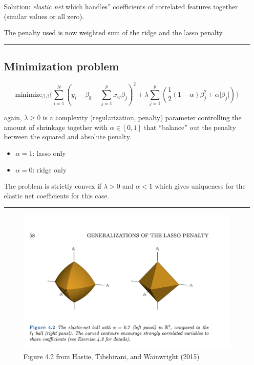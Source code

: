 \documentclass[
  letterpaper,
  DIV=11,
  numbers=noendperiod]{scrartcl}
\providecommand{\tightlist}{%
  \setlength{\itemsep}{0pt}\setlength{\parskip}{0pt}}\usepackage{longtable,booktabs,array}
\begin{document}
Solution: \emph{elastic net} which handles'' coefficients of correlated
features together (similar values or all zero).

The penalty used is now weighted sum of the ridge and the lasso penalty.

\begin{center}\rule{0.5\linewidth}{0.5pt}\end{center}

\hypertarget{minimization-problem}{%
\subsection{Minimization problem}\label{minimization-problem}}

\[ \text{minimize}_{\beta_,\beta} \{ \sum_{i=1}^N (y_i-\beta_0-\sum_{j=1}^p x_{ij}\beta_j )^2 + \lambda \sum_{j=1}^p (\frac{1}{2}(1-\alpha) \beta_j^2+\alpha \lvert \beta_j\rvert )\}\]

again, \(\lambda \ge 0\) is a complexity (regularization, penalty)
parameter controlling the amount of shrinkage together with
\(\alpha \in [0,1]\) that ``balance'' out the penalty between the
squared and absolute penalty.

\begin{itemize}
\tightlist
\item
  \(\alpha=1\): lasso only
\item
  \(\alpha=0\): ridge only
\end{itemize}

The problem is strictly convex if \(\lambda>0\) and \(\alpha<1\) which
gives uniqueness for the elastic net coefficients for this case.

\begin{center}\rule{0.5\linewidth}{0.5pt}\end{center}

\begin{figure}

{\centering \includegraphics[width=1\textwidth,height=\textheight]{./HTWFig42.png}

}

\caption{Figure 4.2 from Hastie, Tibshirani, and Wainwright (2015)}

\end{figure}
\end{document}

